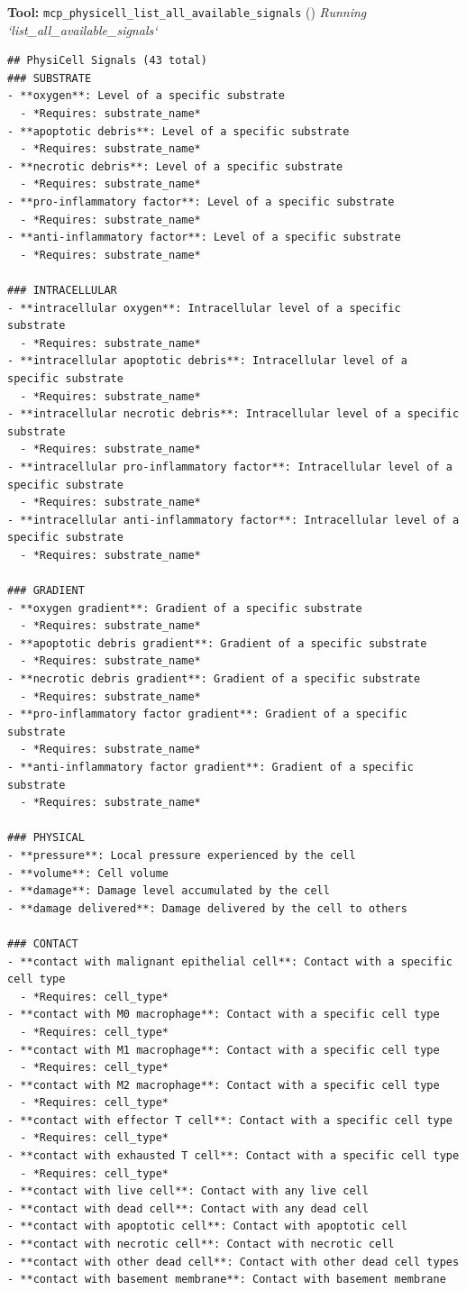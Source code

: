 \documentclass[11pt,a4paper]{article}
\begin{document}
\begin{toolokbox}
\textbf{Tool:} \texttt{mcp\_physicell\_list\_all\_available\_signals} (\checkmark)
\textit{Running `list\_all\_available\_signals`}
\begin{lstlisting}
## PhysiCell Signals (43 total)
### SUBSTRATE
- **oxygen**: Level of a specific substrate
  - *Requires: substrate_name*
- **apoptotic debris**: Level of a specific substrate
  - *Requires: substrate_name*
- **necrotic debris**: Level of a specific substrate
  - *Requires: substrate_name*
- **pro-inflammatory factor**: Level of a specific substrate
  - *Requires: substrate_name*
- **anti-inflammatory factor**: Level of a specific substrate
  - *Requires: substrate_name*

### INTRACELLULAR
- **intracellular oxygen**: Intracellular level of a specific substrate
  - *Requires: substrate_name*
- **intracellular apoptotic debris**: Intracellular level of a specific substrate
  - *Requires: substrate_name*
- **intracellular necrotic debris**: Intracellular level of a specific substrate
  - *Requires: substrate_name*
- **intracellular pro-inflammatory factor**: Intracellular level of a specific substrate
  - *Requires: substrate_name*
- **intracellular anti-inflammatory factor**: Intracellular level of a specific substrate
  - *Requires: substrate_name*

### GRADIENT
- **oxygen gradient**: Gradient of a specific substrate
  - *Requires: substrate_name*
- **apoptotic debris gradient**: Gradient of a specific substrate
  - *Requires: substrate_name*
- **necrotic debris gradient**: Gradient of a specific substrate
  - *Requires: substrate_name*
- **pro-inflammatory factor gradient**: Gradient of a specific substrate
  - *Requires: substrate_name*
- **anti-inflammatory factor gradient**: Gradient of a specific substrate
  - *Requires: substrate_name*

### PHYSICAL
- **pressure**: Local pressure experienced by the cell
- **volume**: Cell volume
- **damage**: Damage level accumulated by the cell
- **damage delivered**: Damage delivered by the cell to others

### CONTACT
- **contact with malignant epithelial cell**: Contact with a specific cell type
  - *Requires: cell_type*
- **contact with M0 macrophage**: Contact with a specific cell type
  - *Requires: cell_type*
- **contact with M1 macrophage**: Contact with a specific cell type
  - *Requires: cell_type*
- **contact with M2 macrophage**: Contact with a specific cell type
  - *Requires: cell_type*
- **contact with effector T cell**: Contact with a specific cell type
  - *Requires: cell_type*
- **contact with exhausted T cell**: Contact with a specific cell type
  - *Requires: cell_type*
- **contact with live cell**: Contact with any live cell
- **contact with dead cell**: Contact with any dead cell
- **contact with apoptotic cell**: Contact with apoptotic cell
- **contact with necrotic cell**: Contact with necrotic cell
- **contact with other dead cell**: Contact with other dead cell types
- **contact with basement membrane**: Contact with basement membrane


\end{lstlisting}
\end{toolokbox}
\end{document}
